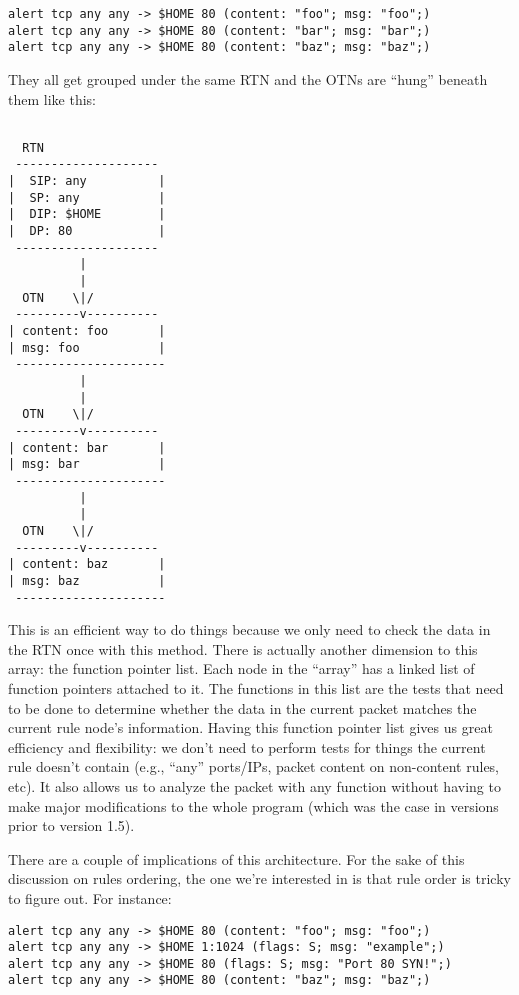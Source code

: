 \documentclass{article}
\begin{document}
\begin{verbatim}
alert tcp any any -> $HOME 80 (content: "foo"; msg: "foo";)
alert tcp any any -> $HOME 80 (content: "bar"; msg: "bar";)
alert tcp any any -> $HOME 80 (content: "baz"; msg: "baz";)
\end{verbatim}

They all get grouped under the same RTN and the OTNs are ``hung'' beneath
them like this:

\begin{verbatim}

  RTN
 --------------------
|  SIP: any          |
|  SP: any           |
|  DIP: $HOME        |
|  DP: 80            |
 -------------------- 
          |
          |
  OTN    \|/  
 ---------v----------
| content: foo       |
| msg: foo           |
 ---------------------
          |
          |
  OTN    \|/  
 ---------v----------
| content: bar       |
| msg: bar           |
 ---------------------
          |
          |
  OTN    \|/  
 ---------v----------
| content: baz       |
| msg: baz           |
 ---------------------
\end{verbatim}

This is an efficient way to do things because we only need to check the
data in the RTN once with this method.  There is actually another
dimension to this array: the function pointer list.  Each node in the
``array'' has a linked list of function pointers attached to it.  The
functions in this list are the tests that need to be done to determine
whether the data in the current packet matches the current rule node's
information.  Having this function pointer list gives us great
efficiency and flexibility: we don't need to perform tests for things
the current rule doesn't contain (e.g., ``any'' ports/IPs, packet content
on non-content rules, etc).  It also allows us to analyze the packet
with any function without having to make major modifications to the
whole program (which was the case in versions prior to version 1.5).

There are a couple of implications of this architecture.  For the sake
of this discussion on rules ordering, the one we're interested in is
that rule order is tricky to figure out.  For instance:

\begin{verbatim}
alert tcp any any -> $HOME 80 (content: "foo"; msg: "foo";)
alert tcp any any -> $HOME 1:1024 (flags: S; msg: "example";)
alert tcp any any -> $HOME 80 (flags: S; msg: "Port 80 SYN!";)
alert tcp any any -> $HOME 80 (content: "baz"; msg: "baz";)
\end{verbatim}
\end{document}

